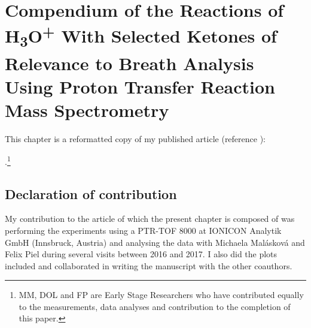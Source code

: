 
\chapter{Compendium of the Reactions of H\textsubscript{3}O\textsuperscript{+} With Selected Ketones of Relevance to Breath Analysis Using Proton Transfer Reaction Mass Spectrometry}\label{chapter:KE}



This chapter is a reformatted copy of my published article (reference \cite{malaskova2019compendium}):

.\footnote{MM, DOL and FP are
Early Stage Researchers who have contributed equally to the measurements, data analyses and contribution to the completion of this paper.}







\section*{Declaration of contribution}
My contribution to the article of which the present chapter is composed of was
performing the experiments using a PTR-TOF 8000 at IONICON Analytik GmbH (Innsbruck, Austria) and analysing the data with Michaela Mal\'askov\'a and Felix Piel during several visits between 2016 and 2017. I also did  the plots included and collaborated in writing the manuscript with the other coauthors. 


